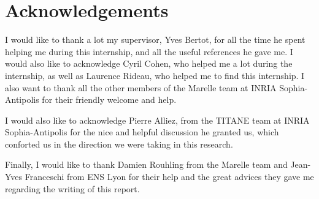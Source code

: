 \documentclass[a4paper,10pt]{article}
\begin{document}
\section{Acknowledgements}
I would like to thank a lot my supervisor, Yves Bertot, for all the time he spent helping me during this internship, and all the useful references he gave me. I would also like to acknowledge Cyril Cohen, who helped me a lot during the internship, as well as Laurence Rideau, who helped me to find this internship. I also want to thank all the other members of the Marelle team at INRIA Sophia-Antipolis for their friendly welcome and help.

I would also like to acknowledge Pierre Alliez, from the TITANE team at INRIA Sophia-Antipolis for the nice and helpful discussion he granted us, which conforted us in the direction we were taking in this research.

Finally, I would like to thank Damien Rouhling from the Marelle team and Jean-Yves Franceschi from ENS Lyon for their help and the great advices they gave me regarding the writing of this report.

\newpage


\end{document}
